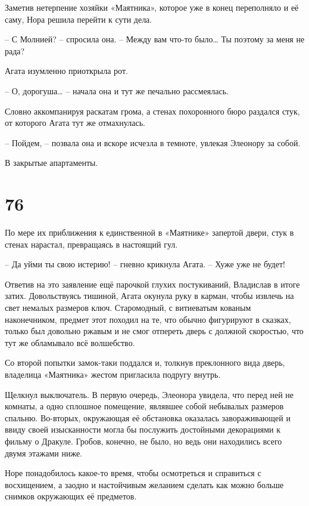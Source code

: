 \documentclass[
  a5paperpaper,
  DIV=11,
  numbers=noendperiod]{scrreprt}
\begin{document}
Заметив нетерпение хозяйки «Маятника», которое уже в конец переполняло и
её саму, Нора решила перейти к сути дела.

-- С Молнией? -- спросила она. -- Между вам что-то было\ldots{} Ты
поэтому за меня не рада?

Агата изумленно приоткрыла рот.

-- О, дорогуша\ldots{} -- начала она и тут же печально рассмеялась.

Словно аккомпанируя раскатам грома, а стенах похоронного бюро раздался
стук, от которого Агата тут же отмахнулась.

-- Пойдем, -- позвала она и вскоре исчезла в темноте, увлекая Элеонору
за собой.

В закрытые апартаменты.

\section*{76}\label{76}


По мере их приближения к единственной в «Маятнике» запертой двери, стук
в стенах нарастал, превращаясь в настоящий гул.

-- Да уйми ты свою истерию! -- гневно крикнула Агата. -- Хуже уже не
будет!

Ответив на это заявление ещё парочкой глухих постукиваний, Владислав в
итоге затих. Довольствуясь тишиной, Агата окунула руку в карман, чтобы
извлечь на свет немалых размеров ключ. Старомодный, с витиеватым кованым
наконечником, предмет этот походил на те, что обычно фигурируют в
сказках, только был довольно ржавым и не смог отпереть дверь с должной
скоростью, что тут же обламывало всё волшебство.

Со второй попытки замок-таки поддался и, толкнув преклонного вида дверь,
владелица «Маятника» жестом пригласила подругу внутрь.

Щелкнул выключатель. В первую очередь, Элеонора увидела, что перед ней
не комнаты, а одно сплошное помещение, являвшее собой небывалых размеров
спальню. Во-вторых, окружающая её обстановка оказалась завораживающей и
ввиду своей изысканности могла бы послужить достойными декорациями к
фильму о Дракуле. Гробов, конечно, не было, но ведь они находились всего
двумя этажами ниже.

Норе понадобилось какое-то время, чтобы осмотреться и справиться с
восхищением, а заодно и настойчивым желанием сделать как можно больше
снимков окружающих её предметов.
\end{document}
